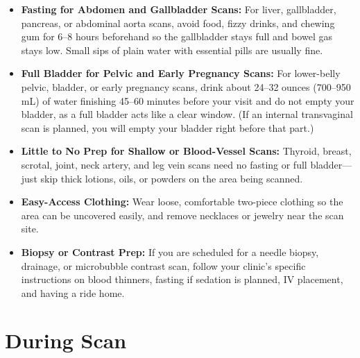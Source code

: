 \begin{itemize}
    \item \textbf{Fasting for Abdomen and Gallbladder Scans:} For liver, gallbladder, pancreas, or abdominal aorta scans, avoid food, fizzy drinks, and chewing gum for 6--8 hours beforehand so the gallbladder stays full and bowel gas stays low. Small sips of plain water with essential pills are usually fine.
    \item \textbf{Full Bladder for Pelvic and Early Pregnancy Scans:} For lower-belly pelvic, bladder, or early pregnancy scans, drink about 24--32 ounces (700--950 mL) of water finishing 45--60 minutes before your visit and do not empty your bladder, as a full bladder acts like a clear window. (If an internal transvaginal scan is planned, you will empty your bladder right before that part.)
    \item \textbf{Little to No Prep for Shallow or Blood-Vessel Scans:} Thyroid, breast, scrotal, joint, neck artery, and leg vein scans need no fasting or full bladder---just skip thick lotions, oils, or powders on the area being scanned.
    \item \textbf{Easy-Access Clothing:} Wear loose, comfortable two-piece clothing so the area can be uncovered easily, and remove necklaces or jewelry near the scan site.
    \item \textbf{Biopsy or Contrast Prep:} If you are scheduled for a needle biopsy, drainage, or microbubble contrast scan, follow your clinic's specific instructions on blood thinners, fasting if sedation is planned, IV placement, and having a ride home.
\end{itemize}

\section{During Scan}

